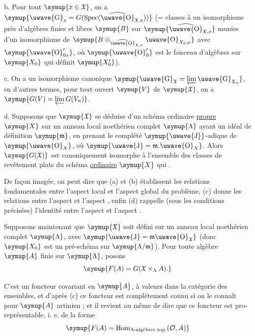 \noindent b. Pour tout $\symup{x\in\mathfrak X}$, on a $\symup{\text{\uwave{G}}_x=G(\operatorname{Spec}(\widehat{\text{\uwave{O}}}_{\mathfrak X,x}))}$ (= classes à un isomorphisme près d'algèbres finies et libres $\symup{B}$ sur
$\symup{\widehat{\text{\uwave{O}}}_{\mathfrak X,x}}$ munies d'un isomorphisme de
$\symup{B\otimes_{\widehat{\text{\uwave{O}}}_{\mathfrak X,x}}\text{\uwave{O}}_{X_0,x}}$ avec
$\symup{\text{\uwave{O}}'_{0x}}$, où $\symup{\text{\uwave{O}}'_0}$ est le faisceau d'algèbres sur
$\symup{X_0}$ qui définit $\symup{X'_0}$).

\noindent c. On a un isomorphisme canonique $\symup{\text{\uwave{G}}_{\mathfrak X}=\varprojlim \text{\uwave{G}}_{\mathfrak X_n}}$, en d'autres termes, pour tout ouvert $\symup{V}$ de $\symup{\mathfrak X}$, on a $\symup{G(V)=\varprojlim G(V_n)}$.

\noindent d. Supposons que $\symup{\mathfrak X}$ se déduise d'un schéma ordinaire
\uline{propre} $\symup{X}$ sur un anneau local noethérien complet $\symup{\Lambda}$ ayant un idéal de
définition $\symup{\mathfrak m}$, en prenant le complété $\symup{\text{\uwave{J}}}$-adique de
$\symup{\text{\uwave{O}}_X}$, où $\symup{\text{\uwave{J}}=\mathfrak m.\text{\uwave{O}}_X}$. Alors
$\symup{G(\mathfrak X)}$ est canoniquement isomorphe à l'ensemble des classes de
revêtement plats du schéma \uline{ordinaire} $\symup{X}$ qui .

De façon imagée, on peut dire que (a) et (b) établissent les relations
fondamentales entre l'aspect local et l'aspect global du problème, (c) donne
les relations entre l'aspect  et l'aspect , enfin (d)
rappelle (sous les conditions précisées) l'identité entre l'aspect 
et l'aspect .

Supposons maintenant que $\symup{\mathfrak X}$ soit défini sur un anneau local
noethérien complet $\symup{\Lambda}$, avec
$\symup{\text{\uwave{J}}=\mathfrak m\text{\uwave{O}}_{\mathfrak X}}$ (donc $\symup{X_0}$ est un
pré-schéma sur $\symup{\Lambda/\mathfrak m}$). Pour toute algèbre $\symup{A}$ finie sur
$\symup{\Lambda}$, posons
\[
  \symup{F(A)=G(\mathfrak X\times_\Lambda A).}
\]

C'est un foncteur covariant en $\symup{A}$, à valeurs dans la catégorie des ensembles,
et d'après (c) ce foncteur est complètement connu si on le connaît pour $\symup{A}$
artinien ; et il revient au même de dire que ce foncteur est pro-représentable,
i. e. de la forme
\[
  \symup{F(A)=\operatorname{Hom}_{\Lambda\text{-algèbres top.}}(\mathcal O,A)}
\]

